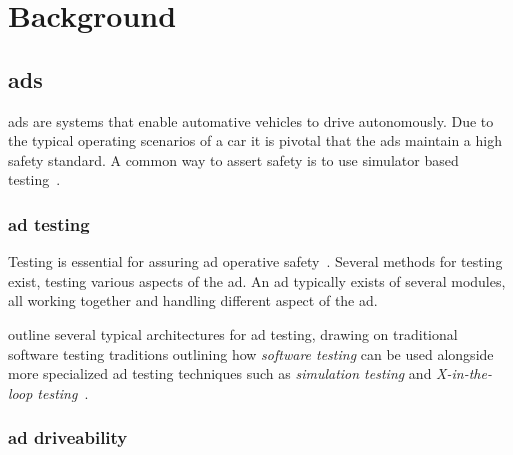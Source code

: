 \section{Background}


% 

\subsection{\acrfull{ads}}

\acrfull{ads} are systems that enable automative vehicles to drive autonomously. Due to the
typical operating scenarios of a car it is pivotal that the \acrlong{ads} maintain a high safety standard. A common way to assert safety
is to use simulator based testing~\cite[1]{DeepScenario}.

\subsubsection{\acrlong{ad} testing}

Testing is essential for assuring \acrlong{ad} operative safety~\cite[163]{ADTestingReview16}.
Several methods for testing exist, testing various aspects of the \acrlong{ad}. An \acrshort{ad}
typically exists of several modules, all working together and handling different aspect of the
\acrlong{ad}.

\citeauthor{ADTestingReview16} outline several typical architectures for \acrshort{ad} testing,
drawing on traditional software testing traditions outlining how \textit{software testing} can be
used alongside more specialized \acrshort{ad} testing techniques such as \textit{simulation testing}
and \textit{X-in-the-loop testing}~\cite[163-164]{ADTestingReview16}.

\subsubsection*{\acrlong{ad} driveability}\label{sec:adsDrivability}

